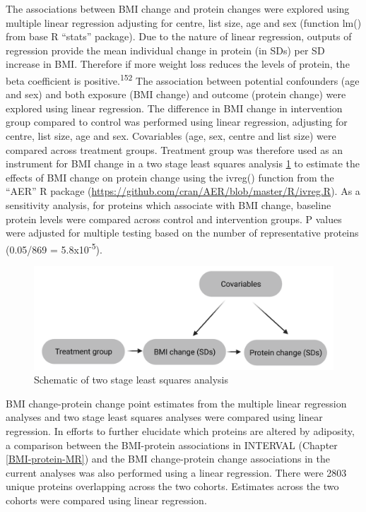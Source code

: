 \documentclass[11pt,twoside]{bristolthesis}
\begin{document}
The associations between BMI change and protein changes were explored using multiple linear regression adjusting for centre, list size, age and sex (function lm() from base R ``stats'' package). Due to the nature of linear regression, outputs of regression provide the mean individual change in protein (in SDs) per SD increase in BMI. Therefore if more weight loss reduces the levels of protein, the beta coefficient is positive.\textsuperscript{152} The association between potential confounders (age and sex) and both exposure (BMI change) and outcome (protein change) were explored using linear regression. The difference in BMI change in intervention group compared to control was performed using linear regression, adjusting for centre, list size, age and sex. Covariables (age, sex, centre and list size) were compared across treatment groups. Treatment group was therefore used as an instrument for BMI change in a two stage least squares analysis \ref{fig:direct-tsls} to estimate the effects of BMI change on protein change using the ivreg() function from the ``AER'' R package (\url{https://github.com/cran/AER/blob/master/R/ivreg.R}). As a sensitivity analysis, for proteins which associate with BMI change, baseline protein levels were compared across control and intervention groups. P values were adjusted for multiple testing based on the number of representative proteins (0.05/869 = 5.8x10\textsuperscript{-5}).



\begin{figure}
\includegraphics{figure/DiRECT/DiRECT_analysis} \caption[Schematic of two stage least squares analysis]{Schematic of two stage least squares analysis}\label{fig:direct-tsls}
\end{figure}
BMI change-protein change point estimates from the multiple linear regression analyses and two stage least squares analyses were compared using linear regression. In efforts to further elucidate which proteins are altered by adiposity, a comparison between the BMI-protein associations in INTERVAL (Chapter \ref{BMI-protein-MR}) and the BMI change-protein change associations in the current analyses was also performed using a linear regression. There were 2803 unique proteins overlapping across the two cohorts. Estimates across the two cohorts were compared using linear regression.
\end{document}

